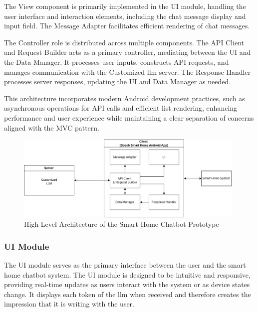 The View component is primarily implemented in the UI module, handling the user interface and interaction elements, including the chat message display and input field. The Message Adapter facilitates efficient rendering of chat messages.

The Controller role is distributed across multiple components. The API Client and Request Builder acts as a primary controller, mediating between the UI and the Data Manager. It processes user inputs, constructs API requests, and manages communication with the Customized \gls{llm} server. The Response Handler processes server responses, updating the UI and Data Manager as needed.

This architecture incorporates modern Android development practices, such as asynchronous operations for API calls and efficient list rendering, enhancing performance and user experience while maintaining a clear separation of concerns aligned with the MVC pattern.


\begin{figure}[h]
\centering
\includegraphics[width=0.98\textwidth]{graphics/ConceptOverview.png}
\caption{High-Level Architecture of the Smart Home Chatbot Prototype}
\label{fig:architecture}
\end{figure}

\subsubsection{UI Module}
The UI module serves as the primary interface between the user and the smart home chatbot system.
The UI module is designed to be intuitive and responsive, providing real-time updates as users interact with the system or as device states change.
It displays each token of the \gls{llm} when received and therefore creates the impression that it is writing with the user.

